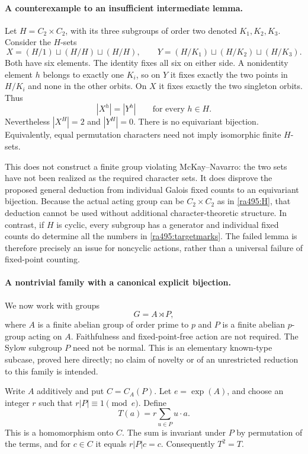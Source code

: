 \documentclass[11pt]{article}
\begin{document}
\paragraph{A counterexample to an insufficient intermediate lemma.}
Let $H=C_2\times C_2$, with its three subgroups of order two denoted
$K_1,K_2,K_3$. Consider the $H$-sets
\[
 X=(H/1)\sqcup(H/H)\sqcup(H/H),\qquad
 Y=(H/K_1)\sqcup(H/K_2)\sqcup(H/K_3).
\]
Both have six elements. The identity fixes all six on either side.
A nonidentity element $h$ belongs to exactly one $K_i$, so on $Y$ it
fixes exactly the two points in $H/K_i$ and none in the other orbits.
On $X$ it fixes exactly the two singleton orbits. Thus
\[
 |X^h|=|Y^h|\qquad\text{for every }h\in H.
\]
Nevertheless $|X^H|=2$ and $|Y^H|=0$. There is no equivariant
bijection. Equivalently, equal permutation characters need not imply
isomorphic finite $H$-sets.

This does not construct a finite group violating McKay--Navarro: the two
sets have not been realized as the required character sets. It does
disprove the proposed general deduction from individual Galois fixed
counts to an equivariant bijection. Because the actual acting group can
be $C_2\times C_2$ as in \eqref{ra495:H}, that deduction cannot be used
without additional character-theoretic structure. In contrast, if $H$
is cyclic, every subgroup has a generator and individual fixed counts
do determine all the numbers in \eqref{ra495:targetmarks}. The failed
lemma is therefore precisely an issue for noncyclic actions, rather than
a universal failure of fixed-point counting.

\paragraph{A nontrivial family with a canonical explicit bijection.}
We now work with groups
\[
 G=A\rtimes P,
\]
where $A$ is a finite abelian group of order prime to $p$ and $P$ is a
finite abelian $p$-group acting on $A$. Faithfulness and fixed-point-free
action are not required. The Sylow subgroup $P$ need not be normal.
This is an elementary known-type subcase, proved here directly; no claim
of novelty or of an unrestricted reduction to this family is intended.

Write $A$ additively and put $C=C_A(P)$. Let $e=\operatorname{exp}(A)$,
and choose an integer $r$ such that $r|P|\equiv1\pmod e$. Define
\begin{equation}\label{ra495:average}
 T(a)=r\sum_{u\in P}u\cdot a.
\end{equation}
This is a homomorphism onto $C$. The sum is invariant under $P$ by
permutation of the terms, and for $c\in C$ it equals $r|P|c=c$.
Consequently $T^2=T$.
\end{document}

